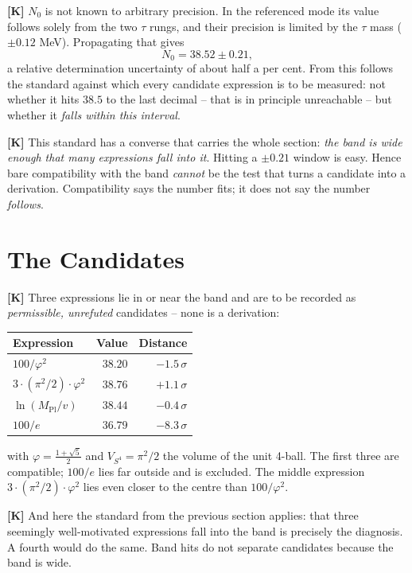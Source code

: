\textbf{[K]} $N_0$ is not known to arbitrary precision. In the referenced mode
its value follows solely from the two $\tau$ rungs, and their precision is limited
by the $\tau$ mass ($\pm 0{.}12$ MeV). Propagating that gives
\[
  N_0 = 38{.}52 \pm 0{.}21 ,
\]
a relative determination uncertainty of about half a per cent. From this follows
the standard against which every candidate expression is to be measured: not
whether it hits $38{.}5$ to the last decimal -- that is in principle unreachable
-- but whether it \emph{falls within this interval}.

\textbf{[K]} This standard has a converse that carries the whole section:
\emph{the band is wide enough that many expressions fall into it}. Hitting a
$\pm 0{.}21$ window is easy. Hence bare compatibility with the band \emph{cannot}
be the test that turns a candidate into a derivation. Compatibility says the
number fits; it does not say the number \emph{follows}.

\section{The Candidates}

\textbf{[K]} Three expressions lie in or near the band and are to be recorded as
\emph{permissible, unrefuted} candidates -- none is a derivation:

\begin{center}
\begin{tabular}{lrr}
\hline
Expression & Value & Distance \\
\hline
$100/\varphi^2$                 & $38{.}20$ & $-1{.}5\,\sigma$ \\
$3\cdot(\pi^2/2)\cdot\varphi^2$ & $38{.}76$ & $+1{.}1\,\sigma$ \\
$\ln(M_\text{Pl}/v)$            & $38{.}44$ & $-0{.}4\,\sigma$ \\
\hline
$100/e$                         & $36{.}79$ & $-8{.}3\,\sigma$ \\
\hline
\end{tabular}
\end{center}

with $\varphi = \tfrac{1+\sqrt5}{2}$ and $V_{S^4} = \pi^2/2$ the volume of the
unit 4-ball. The first three are compatible; $100/e$ lies far outside and is
excluded. The middle expression $3 \cdot (\pi^2/2) \cdot \varphi^2$ lies even
closer to the centre than $100/\varphi^2$.

\textbf{[K]} And here the standard from the previous section applies: that three
seemingly well-motivated expressions fall into the band is precisely the diagnosis.
A fourth would do the same. Band hits do not separate candidates because the band
is wide.

